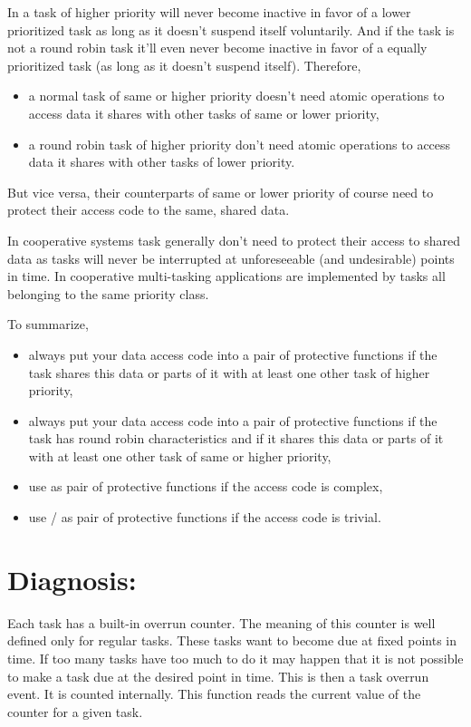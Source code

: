 In \rtos{} a task of higher priority will never become inactive in favor
of a lower prioritized task as long as it doesn't suspend itself
voluntarily. And if the task is not a round robin task it'll even never
become inactive in favor of a equally prioritized task (as long as it
doesn't suspend itself). Therefore,
\begin{itemize}
  \item a normal task of same or higher priority doesn't need atomic
    operations to access data it shares with other tasks of same or lower
    priority,
  \item a round robin task of higher priority don't need atomic operations
    to access data it shares with other tasks of lower priority.
\end{itemize}
But vice versa, their counterparts of same or lower priority of course need to
protect their access code to the same, shared data.

In cooperative systems task generally don't need to protect their access
to shared data as tasks will never be interrupted at unforeseeable (and
undesirable) points in time. In \rtos{} cooperative multi-tasking
applications are implemented by tasks all belonging to the same priority
class.

To summarize, 
\begin{itemize}
  \item always put your data access code into a pair of protective
    functions if the task shares this data or parts of it with at least
    one other task of higher priority,
  \item always put your data access code into a pair of protective
    functions if the task has round robin characteristics and if it shares
    this data or parts of it with at least one other task of same or higher
    priority,
  \item use  as pair of protective
    functions if the access code is complex,
  \item use / as pair of protective functions if the
    access code is trivial.
\end{itemize}


\section{Diagnosis: }

Each task has a built-in overrun counter. The meaning of this counter is
well defined only for regular tasks. These tasks want to become due at
fixed points in time. If too many tasks have too much to do it may happen
that it is not possible to make a task due at the desired point in time.
This is then a task overrun event. It is counted internally. This function
reads the current value of the counter for a given task.


